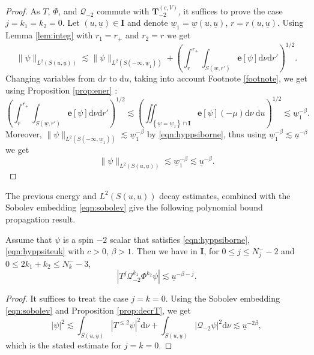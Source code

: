 \documentclass[reqno]{amsart}
\numberwithin{equation}{section}
\newcommand{\mcq}{\mathcal{Q}}
\newcommand{\wbar}{\underline{w}}
\newcommand{\ubar}{{\underline{u}}}
\newcommand{\carterm}{\mcq_{-2}}
\newcommand{\dee}{\mathrm{d}}
\newcommand{\ener}{\mathbf{e}}
\newcommand{\teuk}{\mathbf{T}}
\newcommand{\un}{\mathbf{I}}
\theoremstyle{plain}
\theoremstyle{definition}
\theoremstyle{remark}
\numberwithin{equation}{section}
\begin{document}
\begin{proof}
As $T$, $\Phi$, and $\carterm$ commute with $\teuk_{-2}^{(c,V)}$, it suffices to prove the case $j=k_1=k_2=0$. Let $(u,\ubar)\in\un$ and denote $\wbar_1=\wbar(u,\ubar)$, $r=r(u,\ubar)$. Using Lemma \ref{lem:integ} with $r_1=r_+$ and $r_2=r$ we get 
$$\|\psi\|_{L^2(S(u,\ubar))}\lesssim\|\psi\|_{L^2(S(-\infty,\wbar_1))}+\left(\int_{r}^{r_+}\int_{S(\wbar,r')}\ener[\psi]\dee\nu\dee r'\right)^{1/2}.$$
Changing variables from $\dee r$ to $\dee u$, taking into account Footnote \ref{footnote}, we get using Proposition \ref{prop:ener} :
$$\left(\int_{r}^{r_+}\int_{S(\wbar,r')}\ener[\psi]\dee\nu\dee r'\right)^{1/2}\lesssim \left(\iint_{\left\{\underline{w}=\underline{w}_1\right\} \cap \mathbf{I}} \mathbf{e}[\psi](-\mu) \dee\nu\:\dee u\right)^{1/2}\lesssim\wbar_1^{-\beta}.$$
Moreover, $\|\psi\|_{L^2(S(-\infty,\wbar_1))}\lesssim\wbar_1^{-\beta}$ by \eqref{eqn:hyppsiborne}, thus using $\wbar_1^{-\beta}\lesssim\ubar^{-\beta}$ we get
$$\|\psi\|_{L^2(S(u,\ubar))}\lesssim\wbar_1^{-\beta}\lesssim\ubar^{-\beta}.$$
\end{proof}
The previous energy and $L^2(S(u,\ubar))$ decay estimates, combined with the Sobolev embedding \eqref{eqn:sobolev} give the following polynomial bound propagation result.
\begin{prop}\label{prop:propagI}
    Assume that $\psi$ is a spin $-2$ scalar that satisfies \eqref{eqn:hyppsiborne}, \eqref{eqn:hyppsiteuk} with $c>0$, $\beta>1$. Then we have in $\un$, for $0\leq j\leq N_j^--2$ and $0\leq 2 k_1+k_2\leq N_k^--3$,
    $$|T^j\mcq_{-2}^{k_1}\Phi^{k_2}\psi|\lesssim\ubar^{-\beta-j}.$$
\end{prop}
\begin{proof}
It suffices to treat the case $j=k=0$. Using the Sobolev embedding \eqref{eqn:sobolev} and Proposition \ref{prop:decrT},  we get
$$|\psi|^2\lesssim \int_{S(u,\ubar)}|T^{\leq 2}\psi|^2\dee\nu+\int_{S(u,\ubar)}|\mcq_{-2}\psi|^2\dee\nu\lesssim\ubar^{-2\beta},$$
which is the stated estimate for $j=k=0$.
\end{proof}
\end{document}
